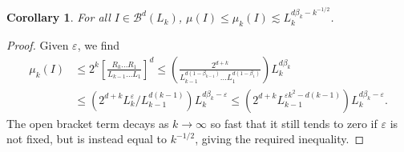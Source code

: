 \documentclass[usenames,dvipsnames]{article}
\theoremstyle{plain}
\newtheorem{corollary}{Corollary}
\theoremstyle{plain}
\begin{document}
\begin{corollary}
	For all $I \in \mathcal{B}^d(L_k)$, $\mu(I) \leq \mu_k(I) \lesssim L_k^{d \beta_k - k^{-1/2}}$.
\end{corollary}
\begin{proof}
	Given $\varepsilon$, we find
	\begin{align*}
		\mu_k(I) &\leq 2^k \left[ \frac{R_k \dots R_1}{L_{k-1} \dots L_1} \right]^d \leq \left( \frac{2^{d + k}}{L_{k-1}^{d(1 - \beta_{k-1})} \dots L_1^{d(1 - \beta_1)}} \right) L_k^{d \beta_k}\\
		&\leq \left( 2^{d + k} L_k^\varepsilon / L_{k-1}^{d(k-1)} \right) L_k^{d \beta_k - \varepsilon} \leq \left( 2^{d + k} L_{k-1}^{\varepsilon k^2 - d(k - 1)} \right) L_k^{d \beta_k - \varepsilon}.
	\end{align*}
	The open bracket term decays as $k \to \infty$ so fast that it still tends to zero if $\varepsilon$ is not fixed, but is instead equal to $k^{-1/2}$, giving the required inequality.
\end{proof}



\end{document}
